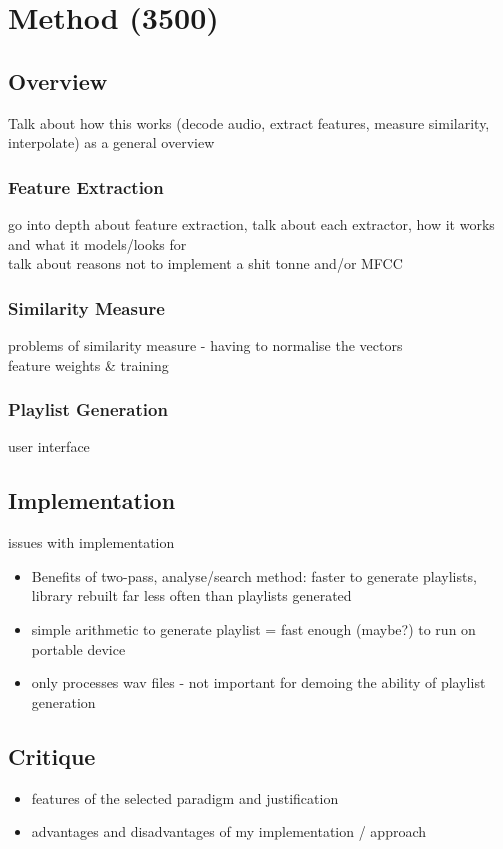 \chapter{Method (3500)}
\section{Overview}
Talk about how this works (decode audio, extract features, measure similarity, interpolate) as a general overview
\subsection{Feature Extraction}
go into depth about feature extraction, talk about each extractor, how it works and what it models/looks for\\
talk about reasons not to implement a shit tonne and/or MFCC
\subsection{Similarity Measure}
problems of similarity measure - having to normalise the vectors\\
feature weights \& training
\subsection{Playlist Generation}
user interface
\section{Implementation}
issues with implementation
\begin{itemize}
	\item Benefits of two-pass, analyse/search method: faster to generate playlists, library rebuilt far less often than playlists generated
	\item simple arithmetic to generate playlist = fast enough (maybe?) to run on portable device
	\item only processes wav files - not important for demoing the ability of playlist generation
\end{itemize}
\section{Critique}
\begin{itemize}
	\item features of the selected paradigm and justification
	\item advantages and disadvantages of my implementation / approach
\end{itemize}

